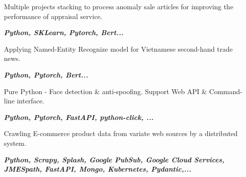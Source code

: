 \documentclass[10pt,a4paper,ragged2e,withhyper]{altacv}
\begin{document}
\divider

\begin{minipage}{\linewidth}
	\justifying
	Multiple projects stacking to process anomaly sale articles for improving the performance of appraisal service.
	
	\textit{\textbf{Python, SKLearn, Pytorch, Bert...}}
	
\end{minipage}

\medskip

\divider

\begin{minipage}{\linewidth}
	\justifying
	Applying Named-Entity Recognize model for Vietnamese second-hand trade news.
	
	\textit{\textbf{Python, Pytorch, Bert...}}
	
\end{minipage}

\medskip

\divider

\begin{minipage}{\linewidth}
	\justifying
	Pure Python - Face detection \& anti-spoofing. Support Web API \& Command-line interface.
	
	\textit{\textbf{Python, Pytorch, FastAPI, python-click, ...}}
	
\end{minipage}

\medskip

\divider

\begin{minipage}{\linewidth}
	\justifying
	Crawling E-commerce product data from variate web sources by a distributed system.
	
	\textit{\textbf{Python, Scrapy, Splash, Google PubSub, Google Cloud Services, JMESpath, FastAPI, Mongo, Kubernetes, Pydantic,...}}
	
\end{minipage}

\medskip

\divider

\medskip
\end{document}
